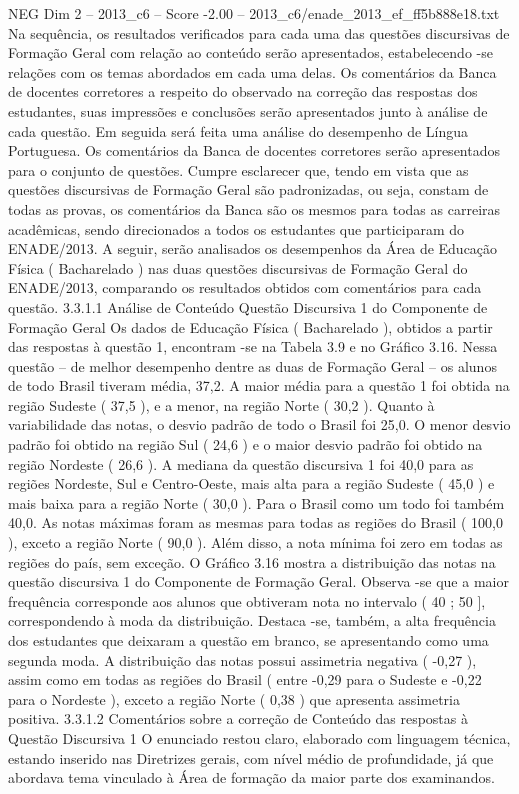 \begin{textsample}{NEG Dim 2 – 2013\_c6 – Score -2.00 – 2013\_c6/enade\_2013\_ef\_ff5b888e18.txt}
Na sequência, os resultados verificados para cada uma das questões discursivas de Formação Geral com relação ao conteúdo serão apresentados, estabelecendo -se relações com os temas abordados em cada uma delas.
Os comentários da Banca de docentes corretores a respeito do observado na correção das respostas dos estudantes, suas impressões e conclusões serão apresentados junto à análise de cada questão.
Em seguida será feita uma análise do desempenho de Língua Portuguesa.
Os comentários da Banca de docentes corretores serão apresentados para o conjunto de questões.
Cumpre esclarecer que, tendo em vista que as questões discursivas de Formação Geral são padronizadas, ou seja, constam de todas as provas, os comentários da Banca são os mesmos para todas as carreiras acadêmicas, sendo direcionados a todos os estudantes que participaram do ENADE/2013.
A seguir, serão analisados os desempenhos da Área de Educação Física ( Bacharelado ) nas duas questões discursivas de Formação Geral do ENADE/2013, comparando os resultados obtidos com comentários para cada questão. 3.3.1.1 Análise de Conteúdo Questão Discursiva 1 do Componente de Formação Geral Os dados de Educação Física ( Bacharelado ), obtidos a partir das respostas à questão 1, encontram -se na Tabela 3.9 e no Gráfico 3.16.
Nessa questão – de melhor desempenho dentre as duas de Formação Geral – os alunos de todo Brasil tiveram média, 37,2.
A maior média para a questão 1 foi obtida na região Sudeste ( 37,5 ), e a menor, na região Norte ( 30,2 ).
Quanto à variabilidade das notas, o desvio padrão de todo o Brasil foi 25,0.
O menor desvio padrão foi obtido na região Sul ( 24,6 ) e o maior desvio padrão foi obtido na região Nordeste ( 26,6 ).
A mediana da questão discursiva 1 foi 40,0 para as regiões Nordeste, Sul e Centro-Oeste, mais alta para a região Sudeste ( 45,0 ) e mais baixa para a região Norte ( 30,0 ).
Para o Brasil como um todo foi também 40,0.
As notas máximas foram as mesmas para todas as regiões do Brasil ( 100,0 ), exceto a região Norte ( 90,0 ).
Além disso, a nota mínima foi zero em todas as regiões do país, sem exceção.
O Gráfico 3.16 mostra a distribuição das notas na questão discursiva 1 do Componente de Formação Geral.
Observa -se que a maior frequência corresponde aos alunos que obtiveram nota no intervalo ( 40 ; 50 ], correspondendo à moda da distribuição.
Destaca -se, também, a alta frequência dos estudantes que deixaram a questão em branco, se apresentando como uma segunda moda.
A distribuição das notas possui assimetria negativa ( -0,27 ), assim como em todas as regiões do Brasil ( entre -0,29 para o Sudeste e -0,22 para o Nordeste ), exceto a região Norte ( 0,38 ) que apresenta assimetria positiva. 3.3.1.2 Comentários sobre a correção de Conteúdo das respostas à Questão Discursiva 1 O enunciado restou claro, elaborado com linguagem técnica, estando inserido nas Diretrizes gerais, com nível médio de profundidade, já que abordava tema vinculado à Área de formação da maior parte dos examinandos.

\end{textsample}
